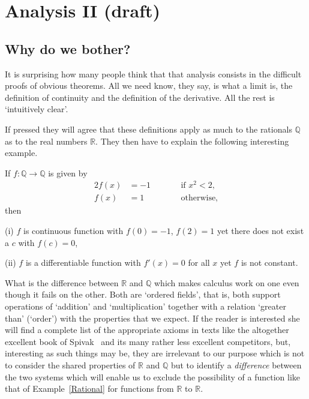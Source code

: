 





\chapter{Analysis II (draft)}


\section{Why do we bother?} It is surprising how many people
think that that analysis consists in the difficult
proofs of obvious theorems. All we need know, they say, is what
a limit is, the definition of continuity
and the definition of the derivative. All the
rest is `intuitively clear'.

If pressed they will agree that these definitions apply as
much to the rationals ${\mathbb Q}$ as to the real
numbers ${\mathbb R}$. They then have
to explain the following interesting
example.
\begin{example}\label{Rational} 
If $f:{\mathbb Q}\rightarrow{\mathbb Q}$
is given by
\begin{alignat*}{2}
f(x)&=-1&&\qquad\text{if $x^{2}<2$,}\\
f(x)&=1&&\qquad\text{otherwise,}
\end{alignat*}
then 

(i) $f$ is continuous function with $f(0)=-1$, $f(2)=1$ yet
there does not exist a $c$ with $f(c)=0$,

(ii) $f$ is a differentiable function with $f'(x)=0$ for
all $x$ yet $f$ is not constant.
\end{example}

What is the difference between ${\mathbb R}$ and ${\mathbb Q}$
which makes  
calculus work on one even though it fails on the other.
Both are `ordered fields', that is, both support operations
of `addition'
and `multiplication' together with a relation `greater than'
(`order') with the properties that we expect. If the
reader is interested she will find a complete list of 
the appropriate axioms in texts like the altogether
excellent book of Spivak~\cite{Spivak} and its
many rather less excellent competitors,
but, interesting as
such things may be, they are irrelevant to our purpose
which is not to consider the shared properties
of ${\mathbb R}$ and ${\mathbb Q}$ 
but to identify  a \emph{difference} between the
two systems which will enable us to exclude the
possibility of a function like that of Example~\ref{Rational}
for functions from ${\mathbb R}$ to ${\mathbb R}$.

